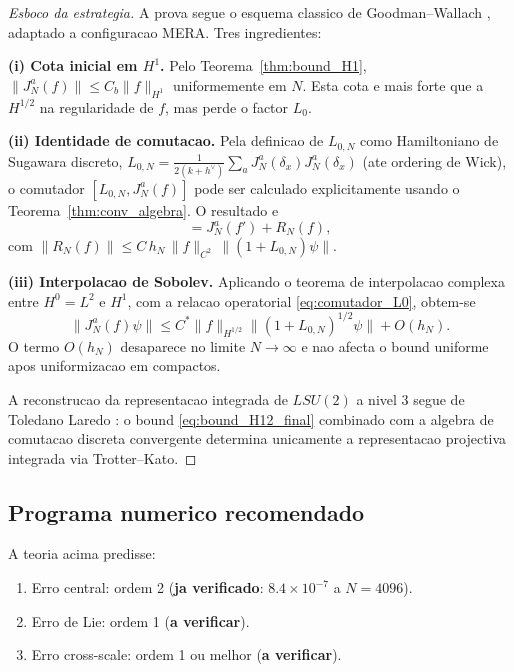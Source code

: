 \begin{proof}[Esboco da estrategia]
A prova segue o esquema classico de Goodman--Wallach \cite{GW1985},
adaptado a configuracao MERA. Tres ingredientes:

\noindent\textbf{(i) Cota inicial em $H^1$.}
Pelo Teorema~\ref{thm:bound_H1}, $\|J_N^a(f)\| \le C_b \|f\|_{H^1}$
uniformemente em $N$. Esta cota e mais forte que a $H^{1/2}$ na
regularidade de $f$, mas perde o factor $L_0$.

\noindent\textbf{(ii) Identidade de comutacao.}
Pela definicao de $L_{0,N}$ como Hamiltoniano de Sugawara discreto,
\(
  L_{0,N} = \frac{1}{2(k+h^\vee)} \sum_a J_N^a(\delta_x) J_N^a(\delta_x)
\)
(ate ordering de Wick), o comutador
$[L_{0,N}, J_N^a(f)]$ pode ser calculado explicitamente usando
o Teorema~\ref{thm:conv_algebra}. O resultado e
\begin{equation}
  [L_{0,N},\,J_N^a(f)] = J_N^a(f') + R_N(f),
  \label{eq:comutador_L0}
\end{equation}
com $\|R_N(f)\| \le C\,h_N\,\|f\|_{C^2}\,\|(1+L_{0,N})\psi\|$.

\noindent\textbf{(iii) Interpolacao de Sobolev.}
Aplicando o teorema de interpolacao complexa entre $H^0 = L^2$ e
$H^1$, com a relacao operatorial \eqref{eq:comutador_L0}, obtem-se
\[
  \|J_N^a(f)\psi\| \le C^* \|f\|_{H^{1/2}} \|(1+L_{0,N})^{1/2}\psi\|
  + O(h_N).
\]
O termo $O(h_N)$ desaparece no limite $N \to \infty$ e nao afecta
o bound uniforme apos uniformizacao em compactos.

A reconstrucao da representacao integrada de $LSU(2)$ a nivel 3 segue
de Toledano Laredo \cite{TL1999}: o bound \eqref{eq:bound_H12_final}
combinado com a algebra de comutacao discreta convergente determina
unicamente a representacao projectiva integrada via Trotter--Kato.
\end{proof}

\subsection{Programa numerico recomendado}

A teoria acima predisse:
\begin{enumerate}
\item Erro central: ordem 2 (\textbf{ja verificado}: $8.4\times 10^{-7}$ a $N=4096$).
\item Erro de Lie: ordem 1 (\textbf{a verificar}).
\item Erro cross-scale: ordem 1 ou melhor (\textbf{a verificar}).
\end{enumerate}

